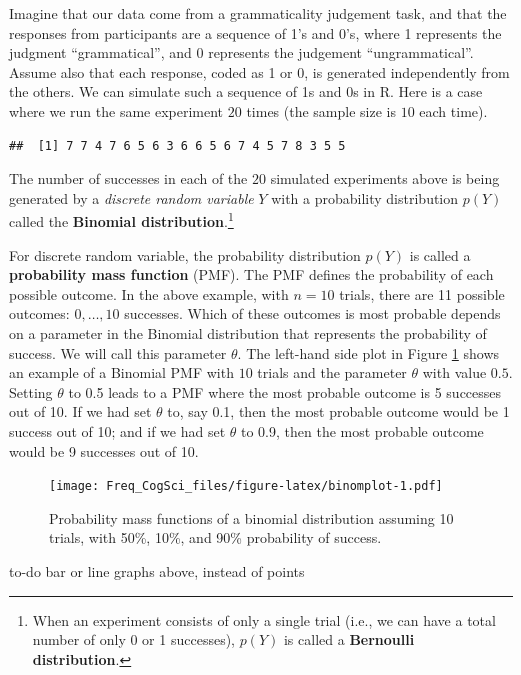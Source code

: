 \documentclass[12pt,]{krantz}
\makeatletter
\newenvironment{kframe}{%
\medskip{}
\setlength{\fboxsep}{.8em}
 \def\at@end@of@kframe{}%
 \ifinner\ifhmode%
  \def\at@end@of@kframe{\end{minipage}}%
  \begin{minipage}{\columnwidth}%
 \fi\fi%
 \def\FrameCommand##1{\hskip\@totalleftmargin \hskip-\fboxsep
 \colorbox{shadecolor}{##1}\hskip-\fboxsep
     \hskip-\linewidth \hskip-\@totalleftmargin \hskip\columnwidth}%
 \MakeFramed {\advance\hsize-\width
   \@totalleftmargin\z@ \linewidth\hsize
   \@setminipage}}%
 {\par\unskip\endMakeFramed%
 \at@end@of@kframe}
\newenvironment{rmdblock}[1]
  {
  \begin{itemize}
  \renewcommand{\labelitemi}{
    \raisebox{-.7\height}[0pt][0pt]{
      {\setkeys{Gin}{width=3em,keepaspectratio}\texttt{[image: images/\#1]}}
    }
  }
  \setlength{\fboxsep}{1em}
  \begin{kframe}
  \item
  }
  {
  \end{kframe}
  \end{itemize}
  }
\newenvironment{rmdnote}
  {\begin{rmdblock}{note}}
  {\end{rmdblock}}
\makeatother
\begin{document}
Imagine that our data come from a grammaticality judgement task, and that the responses from participants are a sequence of 1's and 0's, where 1 represents the judgment ``grammatical'', and 0 represents the judgement ``ungrammatical''. Assume also that each response, coded as 1 or 0, is generated independently from the others. We can simulate such a sequence of 1s and 0s in R. Here is a case where we run the same experiment \(20\) times (the sample size is \(10\) each time).

\begin{verbatim}
##  [1] 7 7 4 7 6 5 6 3 6 6 5 6 7 4 5 7 8 3 5 5
\end{verbatim}

The number of successes in each of the \(20\) simulated experiments above is being generated by a \emph{discrete random variable} \(Y\) with a probability distribution \(p(Y)\) called the \textbf{Binomial distribution}.\footnote{When an experiment consists of only a single trial (i.e., we can have a total number of only 0 or 1 successes), \(p(Y)\) is called a \textbf{Bernoulli distribution}.}

For discrete random variable, the probability distribution \(p(Y)\) is called a \textbf{probability mass function} (PMF). The PMF defines the probability of each possible outcome. In the above example, with \(n=10\) trials, there are 11 possible outcomes: \(0,\dots,10\) successes. Which of these outcomes is most probable depends on a parameter in the Binomial distribution that represents the probability of success. We will call this parameter \(\theta\). The left-hand side plot in Figure \ref{fig:binomplot} shows an example of a Binomial PMF with \(10\) trials and the parameter \(\theta\) with value \(0.5\). Setting \(\theta\) to 0.5 leads to a PMF where the most probable outcome is 5 successes out of 10. If we had set \(\theta\) to, say 0.1, then the most probable outcome would be 1 success out of 10; and if we had set \(\theta\) to 0.9, then the most probable outcome would be 9 successes out of 10.

\begin{figure}
\centering
\texttt{[image: Freq\_CogSci\_files/figure-latex/binomplot-1.pdf]}
\caption{\label{fig:binomplot}Probability mass functions of a binomial distribution assuming 10 trials, with 50\%, 10\%, and 90\% probability of success.}
\end{figure}

\begin{rmdnote}
to-do bar or line graphs above, instead of points
\end{rmdnote}
\end{document}
